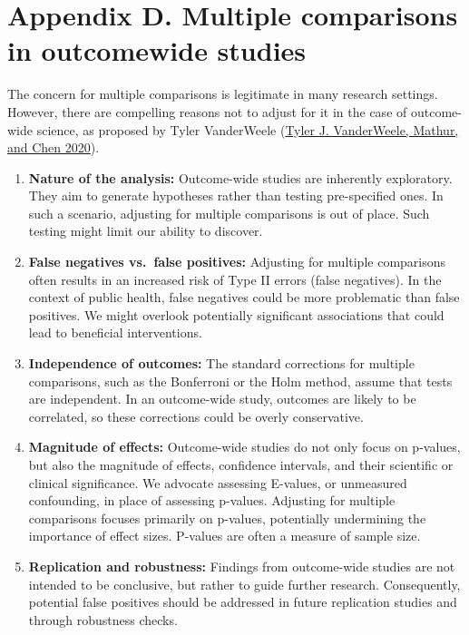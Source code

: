 \documentclass[
  singlecolumn]{report}
\begin{document}
\newpage{}

\hypertarget{appendix-d.-multiple-comparisons-in-outcomewide-studies}{%
\section{Appendix D. Multiple comparisons in outcomewide
studies}\label{appendix-d.-multiple-comparisons-in-outcomewide-studies}}

The concern for multiple comparisons is legitimate in many research
settings. However, there are compelling reasons not to adjust for it in
the case of outcome-wide science, as proposed by Tyler VanderWeele
(\protect\hyperlink{ref-vanderweele2020}{Tyler J. VanderWeele, Mathur,
and Chen 2020}).

\begin{enumerate}
\def\labelenumi{\arabic{enumi}.}
\item
  \textbf{Nature of the analysis:} Outcome-wide studies are inherently
  exploratory. They aim to generate hypotheses rather than testing
  pre-specified ones. In such a scenario, adjusting for multiple
  comparisons is out of place. Such testing might limit our ability to
  discover.
\item
  \textbf{False negatives vs.~false positives:} Adjusting for multiple
  comparisons often results in an increased risk of Type II errors
  (false negatives). In the context of public health, false negatives
  could be more problematic than false positives. We might overlook
  potentially significant associations that could lead to beneficial
  interventions.
\item
  \textbf{Independence of outcomes:} The standard corrections for
  multiple comparisons, such as the Bonferroni or the Holm method,
  assume that tests are independent. In an outcome-wide study, outcomes
  are likely to be correlated, so these corrections could be overly
  conservative.
\item
  \textbf{Magnitude of effects:} Outcome-wide studies do not only focus
  on p-values, but also the magnitude of effects, confidence intervals,
  and their scientific or clinical significance. We advocate assessing
  E-values, or unmeasured confounding, in place of assessing p-values.
  Adjusting for multiple comparisons focuses primarily on p-values,
  potentially undermining the importance of effect sizes. P-values are
  often a measure of sample size.
\item
  \textbf{Replication and robustness:} Findings from outcome-wide
  studies are not intended to be conclusive, but rather to guide further
  research. Consequently, potential false positives should be addressed
  in future replication studies and through robustness checks.
\end{enumerate}
\end{document}
